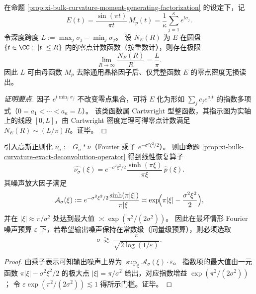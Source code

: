 \begin{proposition}\label{prop:xi-bulk-curvature-depth-span-zero-density}
在命题 \ref{prop:xi-bulk-curvature-moment-generating-factorization} 的设定下，记
\[
E(t)=\frac{\sin(\pi t)}{\pi t}\,M_p(t)=\frac{1}{\kappa}\sum_{j=1}^{\kappa}e^{t\sigma_j}.
\]
令深度跨度
\(
L:=\max_j\sigma_j-\min_j\sigma_j
\)。
设 \(N_E(R)\) 为 \(E\) 在圆盘 \(\{t\in\CC:\ |t|\le R\}\) 内的零点计数函数（按重数计），则存在极限
\[
\boxed{\;\lim_{R\to\infty}\frac{N_E(R)}{R}=\frac{L}{\pi}.\;}
\]
因此 \(L\) 可由母函数 \(M_p\) 去除通用晶格因子后、仅凭整函数 \(E\) 的零点密度无损读出。
\end{proposition}
\begin{proof}[证明要点]
因子 \(e^{t\min_j\sigma_j}\) 不改变零点集合，可将 \(E\) 化为形如 \(\sum_{j}c_j e^{a_j t}\) 的指数多项式（\(0=a_1<\cdots<a_\kappa=L\)）。
该类函数属 Cartwright 型整函数，其指示图为实轴上的线段 \([0,L]\)，由 Cartwright 密度定理可得零点计数满足 \(N_E(R)\sim (L/\pi)R\)。证毕。
\end{proof}

\begin{corollary}\label{cor:xi-bulk-curvature-gaussian-regularization-threshold}
引入高斯正则化 \(\nu_\sigma:=G_\sigma*\nu\)（Fourier 乘子 \(e^{-\sigma^{2}\xi^{2}/2}\)）。
则由命题 \ref{prop:xi-bulk-curvature-exact-deconvolution-operator} 得到线性恢复算子
\[
\widehat{\nu_\sigma}(\xi)=e^{-\sigma^{2}\xi^{2}/2}\frac{\sinh(\pi\xi)}{\pi\xi}\,\widehat p(\xi).
\]
其噪声放大因子满足
\[
\mathcal A_\sigma(\xi):=e^{-\sigma^{2}\xi^{2}/2}\frac{\sinh(\pi|\xi|)}{\pi|\xi|}
\asymp
\exp\!\Bigl(\pi|\xi|-\frac{\sigma^{2}\xi^{2}}{2}\Bigr),
\]
并在 \(|\xi|\approx \pi/\sigma^{2}\) 处达到最大值 \(\asymp \exp(\pi^{2}/(2\sigma^{2}))\)。
因此在最坏情形 Fourier 噪声预算 \(\varepsilon\) 下，若希望输出噪声保持在常数级（同量级预算），则必须选取
\[
\boxed{\;\sigma\ \gtrsim\ \frac{\pi}{\sqrt{2\log(1/\varepsilon)}}.\;}
\]
\end{corollary}
\begin{proof}
由乘子表示可知输出噪声上界为 \(\sup_\xi \mathcal A_\sigma(\xi)\cdot\varepsilon\)。
指数项的最大值由一元函数 \(\pi|\xi|-\sigma^{2}\xi^{2}/2\) 的极大点 \(|\xi|=\pi/\sigma^{2}\) 给出，对应指数增益 \(\exp(\pi^{2}/(2\sigma^{2}))\)；
令 \(\varepsilon\exp(\pi^{2}/(2\sigma^{2}))\lesssim 1\) 得所示门槛。证毕。
\end{proof}

